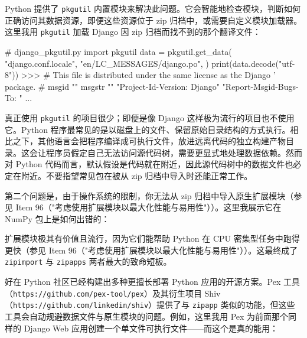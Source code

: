 Python 提供了 \texttt{pkgutil} 内置模块来解决此问题。它会智能地检查模块，判断如何正确访问其数据资源，即便这些资源位于 zip 归档中，或需要自定义模块加载器。这里我用 \texttt{pkgutil} 加载 Django 因 zip 归档而找不到的那个翻译文件：

\begin{codebox}[python]
# django_pkgutil.py
import pkgutil
data = pkgutil.get_data(
    "django.conf.locale",
    "en/LC_MESSAGES/django.po",
)
print(data.decode("utf-8"))
>>>
# This file is distributed under the same license as the Django
' package.
#
msgid ""
msgstr ""
"Project-Id-Version: Django\n"
"Report-Msgid-Bugs-To: \n"
...
\end{codebox}

真正使用 \texttt{pkgutil} 的项目很少；即便是像 Django 这样极为流行的项目也不使用它。Python 程序最常见的是以磁盘上的文件、保留原始目录结构的方式执行。相比之下，其他语言会把程序编译成可执行文件，放进远离代码的独立构建产物目录。这会让程序员假定自己无法访问源代码树，需要更显式地处理数据依赖。然而对 Python 代码而言，默认假设是代码就在附近，因此源代码树中的数据文件也必定在附近。不要指望常见包在被从 zip 归档中导入时还能正常工作。

第二个问题是，由于操作系统的限制，你无法从 zip 归档中导入原生扩展模块（参见 Item 96（"考虑使用扩展模块以最大化性能与易用性"））。这里我展示它在 NumPy 包上是如何出错的：


扩展模块极其有价值且流行，因为它们能帮助 Python 在 CPU 密集型任务中跑得更快（参见 Item 96（"考虑使用扩展模块以最大化性能与易用性"））。这最终成了 \texttt{zipimport} 与 \texttt{zipapps} 两者最大的致命短板。

好在 Python 社区已经构建出多种更擅长部署 Python 应用的开源方案。Pex 工具（\texttt{https://github.com/pex-tool/pex}）及其衍生项目 Shiv（\texttt{https://github.com/linkedin/shiv}）提供了与 \texttt{zipapp} 类似的功能，但这些工具会自动规避数据文件与原生模块的问题。例如，这里我用 Pex 为前面那个同样的 Django Web 应用创建一个单文件可执行文件——而这个是真的能用：

